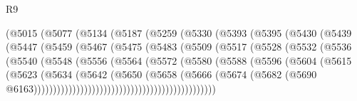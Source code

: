 \begin{lexlean}{R9}
\begin{coremodule}
                    (@5015
                      (@5077
                        (@5134
                          (@5187
                            (@5259
                              (@5330
                                (@5393
                                  (@5395
                                    (@5430
                                      (@5439
                                        (@5447
                                          (@5459
                                            (@5467
                                              (@5475
                                                (@5483
                                                  (@5509
                                                    (@5517
                                                      (@5528
                                                        (@5532
                                                          (@5536
                                                            (@5540
                                                              (@5548
                                                                (@5556
                                                                  (@5564
                                                                    (@5572
                                                                      (@5580
                                                                        (@5588
                                                                          (@5596
                                                                            (@5604
                                                                              (@5615
                                                                                (@5623
                                                                                  (@5634
                                                                                    (@5642
                                                                                      (@5650
                                                                                        (@5658
                                                                                          (@5666
                                                                                            (@5674
                                                                                              (@5682
                                                                                                (@5690
                                                                                                  @6163)))))))))))))))))))))))))))))))))))))))))))))))

\end{coremodule}
\end{lexlean}

